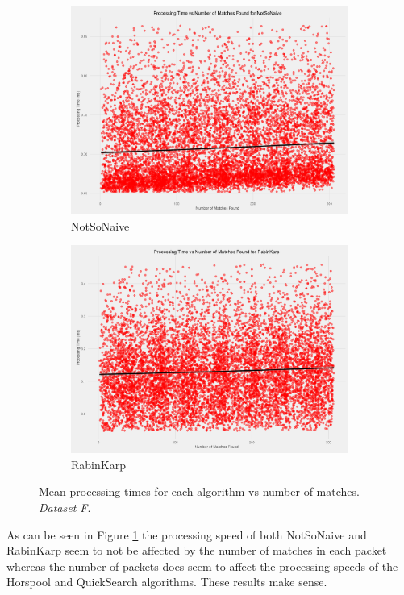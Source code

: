 \documentclass[11pt]{article}
\begin{document}
\begin{figure}[!htb]
\begin{subfigure}[b]{0.48\textwidth}
      \includegraphics[width=\textwidth]{images/processing_speed_vs_num_matches_NotSoNaive}
      \caption{NotSoNaive}
  \end{subfigure}
  \begin{subfigure}[b]{0.48\textwidth}
      \includegraphics[width=\textwidth]{images/processing_speed_vs_num_matches_RabinKarp}
      \caption{RabinKarp}
  \end{subfigure}
  \caption{Mean processing times for each algorithm vs number of matches. \textit{Dataset F}.}
  \label{figure-individualalgorithmsvsnumberofmatches}
\end{figure}

As can be seen in Figure \ref{figure-individualalgorithmsvsnumberofmatches} the processing speed of both NotSoNaive and RabinKarp seem to not be affected by the number of matches in each packet whereas the number of packets does seem to affect the processing speeds of the Horspool and QuickSearch algorithms. These results make sense. 
\end{document}
